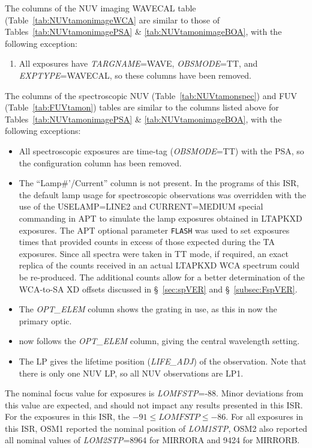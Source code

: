 The columns of the NUV imaging WAVECAL table (Table~\ref{tab:NUVtamonimageWCA} are similar to those of Tables~\ref{tab:NUVtamonimagePSA} \& \ref{tab:NUVtamonimageBOA}, with the following exception:
\begin{enumerate}
\item All exposures have \textit{TARGNAME}=WAVE, \textit{OBSMODE}=TT, and \textit{EXPTYPE}=WAVECAL, so these columns have been removed.
\end{enumerate}

The columns of the spectroscopic NUV (Table~\ref{tab:NUVtamonspec}) and FUV (Table~\ref{tab:FUVtamon}) tables are similar to the columns listed above for Tables~\ref{tab:NUVtamonimagePSA} \& \ref{tab:NUVtamonimageBOA}, with the following exceptions:
\begin{itemize}
\item All spectroscopic exposures are time-tag (\textit{OBSMODE}=TT) with the PSA, so the configuration column has been removed.
\item The ``Lamp\#'/Current'' column is not present. In the programs of this ISR, the default \plampone{} lamp usage for spectroscopic observations was overridden with the use of the \textsc{USELAMP=LINE2} and \textsc{CURRENT=MEDIUM} special commanding
in APT to simulate the lamp exposures obtained in \textsc{LTAPKXD} exposures.
The APT optional parameter \texttt{FLASH} was used to set \plamptwo{} exposures times that
provided counts in excess of those expected during the TA exposures.  Since all spectra were taken in TT mode,
if required, an exact replica of the counts received in an actual \textsc{LTAPKXD} WCA spectrum could be re-produced.
The additional counts allow for a better determination of the WCA-to-SA XD offsets discussed in \S~\ref{sec:spVER} and \S~\ref{subsec:FspVER}.
\item The \textit{OPT\_ELEM} column shows the grating in use, as this in now the primary optic.
\item \cenwave{} now follows the \textit{OPT\_ELEM} column, giving the central wavelength setting.
\item The LP gives the lifetime position (\textit{LIFE\_ADJ}) of the observation. Note that there is only one NUV LP, so all NUV observations are LP1.
\end{itemize}
\normalsize

The nominal focus value for  exposures is \textit{LOMFSTP}=-88. Minor deviations from this value are expected, and should not impact any results presented in this ISR.
For the exposures in this ISR, the $-91\leq \textit{LOMFSTP} \leq-86 $. For all exposures in this ISR, OSM1 reported the nominal  position of \textit{LOM1STP}, OSM2
also reported all nominal values of \textit{LOM2STP}=8964 for MIRRORA and  9424 for MIRRORB.




